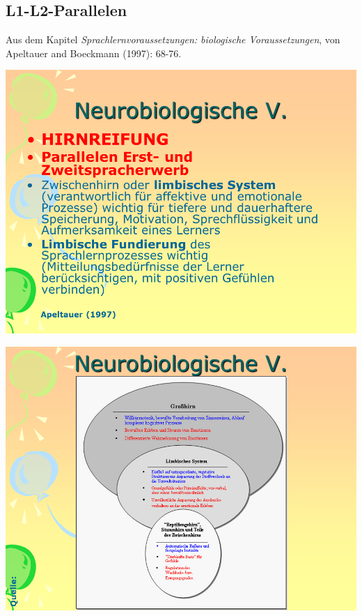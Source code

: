 \documentclass[
  letterpaper,
]{scrbook}
\begin{document}
\hypertarget{l1-l2-parallelen}{%
\subsection{L1-L2-Parallelen}\label{l1-l2-parallelen}}

Aus dem Kapitel \emph{Sprachlernvoraussetzungen: biologische
Voraussetzungen}, von Apeltauer and Boeckmann (1997): 68-76.

\includegraphics[width=1\textwidth,height=\textheight]{./pictures/neuro/Diapozitiv90.PNG}

\includegraphics[width=1\textwidth,height=\textheight]{./pictures/neuro/Diapozitiv91.PNG}
\end{document}
